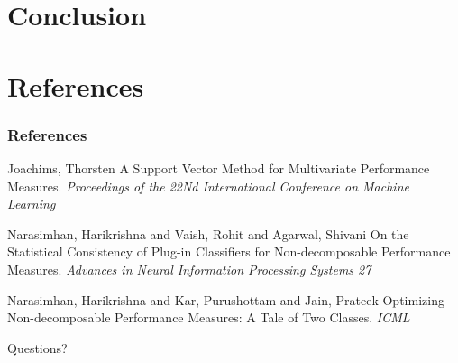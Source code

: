 \documentclass{beamer}
\begin{document}

\section{Conclusion} %

\begin{frame}
	\frametitle{}
	
\end{frame}


\section{References} %

\begin{frame}
	\frametitle{References}
	\footnotesize{
		\begin{thebibliography}{99} %
			 Joachims, Thorsten
			\newblock A Support Vector Method for Multivariate Performance Measures.
			\newblock \emph{Proceedings of the 22Nd International Conference on Machine Learning}
			
			
			 Narasimhan, Harikrishna and Vaish, Rohit and Agarwal, Shivani
			\newblock On the Statistical Consistency of Plug-in Classifiers for Non-decomposable Performance Measures.
			\newblock \emph{Advances in Neural Information Processing Systems 27}
			
			 Narasimhan, Harikrishna and Kar, Purushottam and Jain, Prateek
			\newblock Optimizing Non-decomposable Performance Measures: A Tale of Two Classes.
			\newblock \emph{ICML}
			
			
			
		\end{thebibliography}
	}
\end{frame}


\begin{frame}
	\Huge{\centerline{Questions?}}
\end{frame}

\end{document}

